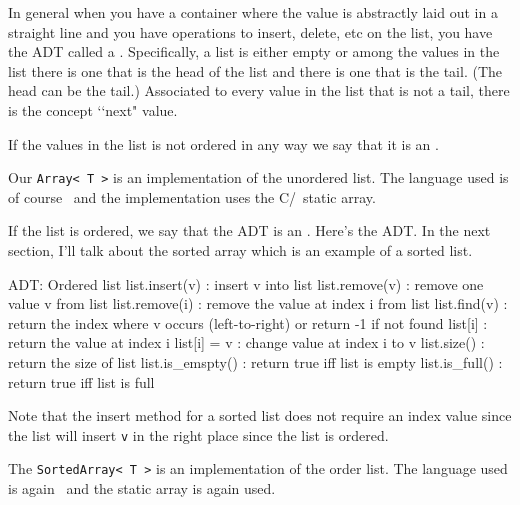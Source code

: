 In general when you have a container where the value
is abstractly laid out in a straight line and you have operations
to insert, delete, etc on the list, you have 
the ADT called a .
Specifically, a list is either empty or among the values in the list
there is one that is the head of the list and there is one that is the tail.
(The head can be the tail.)
Associated to every value in the list that is not a tail, there is the
concept
\lq\lq next" value.

If the values in the list is not ordered in any way we say that
it is
an .

Our \verb!Array< T >! is an implementation of the unordered list.
The language used is of course \cpp\ and the implementation uses
the
C/\cpp\ static array.

If the list is ordered, we say that the ADT is an .
Here's the ADT. In the next section, I'll talk about
the sorted array which is an example of a sorted list.
\begin{console}[fontsize=\footnotesize]
ADT: Ordered list
list.insert(v)   : insert v into list
list.remove(v)   : remove one value v from list
list.remove(i)   : remove the value at index i from list
list.find(v)     : return the index where v occurs (left-to-right)
                   or return -1 if not found
list[i]          : return the value at index i
list[i] = v      : change value at index i to v
list.size()      : return the size of list
list.is_emspty()  : return true iff list is empty
list.is_full()   : return true iff list is full
\end{console}

Note that the insert method for a sorted list does not require an index value since
the list will insert \verb!v! in the right place since
the list is ordered.
    
The \verb!SortedArray< T >! is an implementation of the order list.
The language used is again \cpp\ and the static array is again used.
